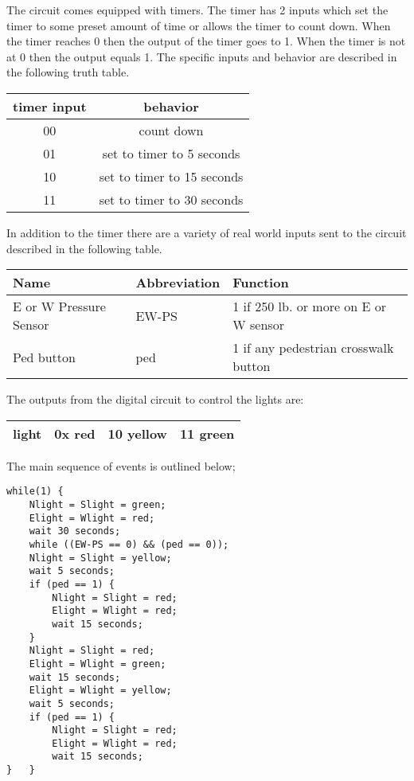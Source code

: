 \begin{enumerate}
        The circuit comes equipped with timers.
        The timer has 2 inputs which set the timer to some preset
        amount of time or allows the timer to count down.  When the
        timer reaches 0 then the output of the timer goes to 1.
        When the timer is not at 0 then the output equals 1.
        The specific inputs and behavior are described in the following
        truth table.

        \begin{tabular}{|c|c|} \hline
            timer input & behavior          \\ \hline \hline
            00 & count down                 \\ \hline
            01 & set to timer to 5  seconds \\ \hline
            10 & set to timer to 15 seconds \\ \hline
            11 & set to timer to 30 seconds \\ \hline
        \end{tabular}

        In addition to the timer there are a variety of real world inputs
        sent to the circuit described in the following table.

        \begin{tabular}{|l|l|l|} \hline
            Name                    & Abbreviation & Function \\                       \hline \hline
            E or W Pressure Sensor  & EW-PS & 1 if 250 lb. or more on E or W sensor \\ \hline
            Ped button              & ped   & 1 if any pedestrian crosswalk button  \\ \hline
        \end{tabular}

        The outputs from the digital circuit to control the lights are:

        \begin{tabular}{|l|l|l|l|} \hline
            light           & 0x red &  10 yellow & 11 green \\ \hline
        \end{tabular}

        The main sequence of events is outlined below;
\begin{verbatim}
while(1) {
    Nlight = Slight = green;
    Elight = Wlight = red;
    wait 30 seconds;
    while ((EW-PS == 0) && (ped == 0));
    Nlight = Slight = yellow;
    wait 5 seconds;
    if (ped == 1) {
        Nlight = Slight = red;
        Elight = Wlight = red;
        wait 15 seconds;
    }
    Nlight = Slight = red;
    Elight = Wlight = green;
    wait 15 seconds;
    Elight = Wlight = yellow;
    wait 5 seconds;
    if (ped == 1) {
        Nlight = Slight = red;
        Elight = Wlight = red;
        wait 15 seconds;
}   }
\end{verbatim}


\end{enumerate}
